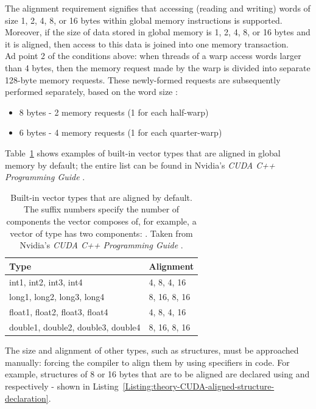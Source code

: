 The alignment requirement signifies that accessing (reading and writing) words of size 1, 2, 4, 8, or 16 bytes within global memory instructions is supported. Moreover, if the size of data stored in global memory is 1, 2, 4, 8, or 16 bytes and it is aligned, then access to this data is joined into one memory transaction. \\
Ad point 2 of the conditions above: when threads of a warp access words larger than 4 bytes, then the memory request made by the warp is divided into separate 128-byte memory requests. These newly-formed requests are subsequently performed separately, based on the word size \cite{NVIDIAMay2022}:

\begin{itemize}
	\item 8 bytes - 2 memory requests (1 for each half-warp)
	\item 6 bytes - 4 memory requests (1 for each quarter-warp)
\end{itemize}

Table~\ref{Table:theory-CUDA-built-in-aligned-vector-types} shows examples of built-in vector types that are aligned in global memory by default; the entire list can be found in Nvidia's \emph{CUDA C++ Programming Guide} \cite{NVIDIAMay2022}.

\begin{table}[ht!]
	\centering
	\renewcommand{\arraystretch}{1.5}
	\begin{tabular}{ |l|l| } 
		\hline
		\textbf{Type} & \textbf{Alignment} \\
		\hline
		int1, int2, int3, int4 & 4, 8, 4, 16 \\
		long1, long2, long3, long4 & 8, 16, 8, 16 \\
		float1, float2, float3, float4 & 4, 8, 4, 16 \\
		double1, double2, double3, double4 & 8, 16, 8, 16 \\
		\hline
	\end{tabular}
	\caption{Built-in vector types that are aligned by default. The suffix numbers specify the number of components the vector composes of, for example, a vector of type  has two components: . Taken from Nvidia's \emph{CUDA C++ Programming Guide} \cite{NVIDIAMay2022}.}
	\label{Table:theory-CUDA-built-in-aligned-vector-types}
\end{table}

The size and alignment of other types, such as structures, must be approached manually: forcing the compiler to align them by using specifiers in code. For example, structures of 8 or 16 bytes that are to be aligned are declared using  and  respectively - shown in Listing~\ref{Listing:theory-CUDA-aligned-structure-declaration}.

